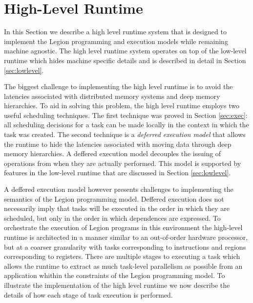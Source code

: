 
\section{High-Level Runtime} 
\label{sec:highlevel}
In this Section we describe a high level runtime system
that is designed to implement the Legion programming
and execution models while remaining machine agnostic.  
The high level runtime system operates on top of the 
low-level runtime which hides machine specific details
and is described in detail in Section \ref{sec:lowlevel}.

The biggest challenge to implementing the high level
runtime is to avoid the latencies associated with distributed
memory systems and deep memory hierarchies.  To aid
in solving this problem, the high level runtime employs two useful 
scheduling techniques.  The first technique was proved
in Section \ref{sec:exec}: all scheduling decisions for a
task can be made locally in the context in which the
task was created.  The second technique is a {\em deferred execution model} 
that allows the runtime to hide the latencies associated
with moving data through deep memory hierarchies.  A
deffered execution model decouples the issuing of operations
from when they are actually performed.  This model is supported
by features in the low-level runtime that are discussed in Section \ref{sec:lowlevel}.


A deffered execution model however presents challenges to implementing
the semantics of the Legion programming model.  Deffered execution
does not necessarily imply that tasks will be executed in the order in
which they are scheduled, but only in the order in which dependences
are expressed.  To orchestrate the execution of Legion
programs in this environment the high-level runtime is architected
in a manner similar to an out-of-order hardware processor, but at
a coarser granularity with tasks corresponding to instructions and
regions corresponding to registers.  There are multiple stages to 
executing a task which allows the runtime to extract
as much task-level parallelism as possible from an application whithin
the constraints of the Legion programming model.  To illustrate
the implementation of the high level runtime we now describe the
details of how each stage of task execution is performed.

